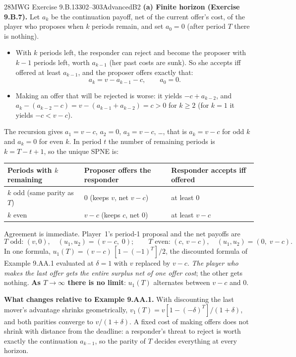 \begin{exsol}{28}{MWG Exercise 9.B.13}{302--303}{Advanced}{B2}
\textbf{(a) Finite horizon (Exercise 9.B.7).} Let $a_k$ be the continuation payoff, net of the
current offer's cost, of the player who proposes when $k$ periods remain, and set $a_0 = 0$
(after period $T$ there is nothing).
\begin{itemize}
  \item With $k$ periods left, the responder can reject and become the proposer with $k-1$
  periods left, worth $a_{k-1}$ (her past costs are sunk). So she accepts iff offered at least
  $a_{k-1}$, and the proposer offers exactly that:
  \[
    a_k = v - a_{k-1} - c, \qquad a_0 = 0 .
  \]
  \item Making an offer that will be rejected is worse: it yields $-c + a_{k-2}$, and
  $a_k - (a_{k-2} - c) = v - (a_{k-1} + a_{k-2}) = c > 0$ for $k \ge 2$ (for $k = 1$ it yields
  $-c < v - c$).
\end{itemize}
The recursion gives $a_1 = v - c$, $a_2 = 0$, $a_3 = v - c$, \dots, that is
$a_k = v - c$ for odd $k$ and $a_k = 0$ for even $k$. In period $t$ the number of remaining
periods is $k = T - t + 1$, so the unique SPNE is:
\begin{center}
\begin{tabularx}{\textwidth}{XXX}
\toprule
Periods with $k$ remaining & Proposer offers the responder & Responder accepts iff offered \\
\midrule
$k$ odd (same parity as $T$) & $0$ (keeps $v$, net $v - c$) & at least $0$ \\
$k$ even & $v - c$ (keeps $c$, net $0$) & at least $v - c$ \\
\bottomrule
\end{tabularx}
\end{center}
Agreement is immediate. Player~1's period-1 proposal and the net payoffs are
\[
  T \text{ odd: } (v, 0), \quad (u_1, u_2) = (v - c,\; 0); \qquad
  T \text{ even: } (c,\, v - c), \quad (u_1, u_2) = (0,\; v - c).
\]
In one formula, $u_1(T) = (v - c)\,[1 - (-1)^T]/2$, the discounted formula of
Example 9.AA.1 evaluated at $\delta = 1$ with $v$ replaced by $v - c$. \emph{The player who makes
the last offer gets the entire surplus net of one offer cost}; the other gets nothing.
\textbf{As $T \to \infty$ there is no limit}: $u_1(T)$ alternates between $v - c$ and $0$.

\textbf{What changes relative to Example 9.AA.1.} With discounting the last mover's advantage
shrinks geometrically, $v_1(T) = v[1 - (-\delta)^T]/(1+\delta)$, and both parities converge to
$v/(1+\delta)$. A fixed cost of making offers does not shrink with distance from the deadline: a
responder's threat to reject is worth exactly the continuation $a_{k-1}$, so the parity of $T$
decides everything at every horizon.


\end{exsol}
